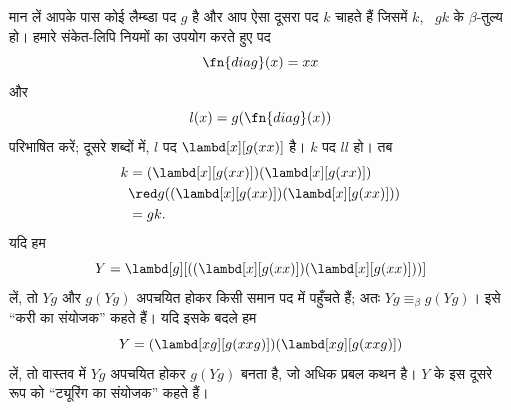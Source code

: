 \documentclass[../../../include/open-logic-section]{subfiles}
\begin{document}

मान लें आपके पास कोई लैम्ब्डा पद $g$ है और आप ऐसा दूसरा पद $k$ चाहते हैं
जिसमें $k$, ~$gk$ के $\beta$-तुल्य हो। हमारे संकेत-लिपि नियमों का उपयोग
करते हुए पद
\[
\fn{diag}(x) = xx
\]
और
\[
l(x) = g(\fn{diag}(x))
\]
परिभाषित करें; दूसरे शब्दों में, $l$ पद $\lambd[x][g(xx)]$ है। $k$ पद
$ll$ हो। तब
\begin{align*}
k & = (\lambd[x][g(xx)])(\lambd[x][g(xx)]) \\
& \red  g((\lambd[x][g(xx)])(\lambd[x][g(xx)])) \\
& = gk.
\end{align*}
यदि हम
\[
Y = \lambd[g][((\lambd[x][g(xx)])(\lambd[x][g(xx)]))]
\]
लें, तो $Yg$ और $g(Yg)$ अपचयित होकर किसी समान पद में पहुँचते हैं; अतः $Yg
\equiv_\beta g(Yg)$। इसे ``करी का संयोजक'' कहते हैं। यदि इसके बदले हम
\[
Y = (\lambd[xg][g(xxg)])(\lambd[xg][g(xxg)])
\]
लें, तो वास्तव में $Yg$ अपचयित होकर $g(Yg)$ बनता है, जो अधिक प्रबल कथन
है। $Y$ के इस दूसरे रूप को ``ट्यूरिंग का संयोजक'' कहते हैं।
\end{document}

